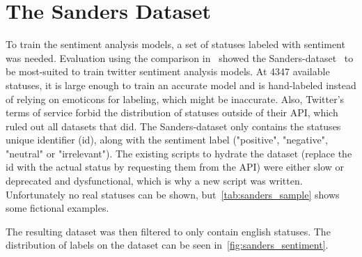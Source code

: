 \section{The Sanders Dataset}
\label{sec:theSandersDataset}

To train the sentiment analysis models, a set of statuses labeled with sentiment was needed.
Evaluation using the comparison in~\cite{Saif2013} showed the Sanders-dataset~\cite{sanders} to be most-suited to train twitter sentiment analysis models.
At 4347 available statuses, it is large enough to train an accurate model and is hand-labeled instead of relying on emoticons for labeling, which might be inaccurate.
Also, Twitter's terms of service forbid the distribution of statuses outside of their API, which ruled out all datasets that did.
The Sanders-dataset only contains the statuses unique identifier (id), along with the sentiment label ("positive", "negative", "neutral" or "irrelevant").
The existing scripts to hydrate the dataset (replace the id with the actual status by requesting them from the API) were either slow or deprecated and dysfunctional,
which is why a new script was written.
Unfortunately no real statuses can be shown, but~\ref{tab:sanders_sample} shows some fictional examples.

\begin{table}
    \caption{Some fictional statuses with labels}
    \label{tab:sanders_sample}
\end{table}

The resulting dataset was then filtered to only contain english statuses.
The distribution of labels on the dataset can be seen in~\ref{fig:sanders_sentiment}.


